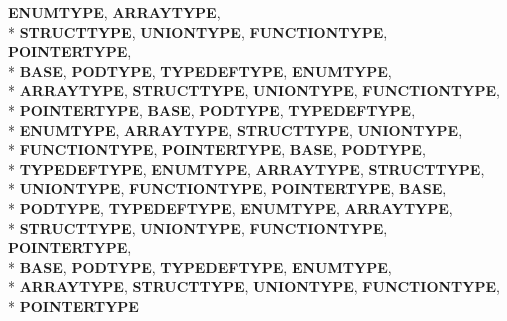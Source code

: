 \begin{DoxyCompactItemize}
{\bfseries E\-N\-U\-M\-T\-Y\-P\-E}, 
{\bfseries A\-R\-R\-A\-Y\-T\-Y\-P\-E}, 
\\*
{\bfseries S\-T\-R\-U\-C\-T\-T\-Y\-P\-E}, 
{\bfseries U\-N\-I\-O\-N\-T\-Y\-P\-E}, 
{\bfseries F\-U\-N\-C\-T\-I\-O\-N\-T\-Y\-P\-E}, 
{\bfseries P\-O\-I\-N\-T\-E\-R\-T\-Y\-P\-E}, 
\\*
{\bfseries B\-A\-S\-E}, 
{\bfseries P\-O\-D\-T\-Y\-P\-E}, 
{\bfseries T\-Y\-P\-E\-D\-E\-F\-T\-Y\-P\-E}, 
{\bfseries E\-N\-U\-M\-T\-Y\-P\-E}, 
\\*
{\bfseries A\-R\-R\-A\-Y\-T\-Y\-P\-E}, 
{\bfseries S\-T\-R\-U\-C\-T\-T\-Y\-P\-E}, 
{\bfseries U\-N\-I\-O\-N\-T\-Y\-P\-E}, 
{\bfseries F\-U\-N\-C\-T\-I\-O\-N\-T\-Y\-P\-E}, 
\\*
{\bfseries P\-O\-I\-N\-T\-E\-R\-T\-Y\-P\-E}, 
{\bfseries B\-A\-S\-E}, 
{\bfseries P\-O\-D\-T\-Y\-P\-E}, 
{\bfseries T\-Y\-P\-E\-D\-E\-F\-T\-Y\-P\-E}, 
\\*
{\bfseries E\-N\-U\-M\-T\-Y\-P\-E}, 
{\bfseries A\-R\-R\-A\-Y\-T\-Y\-P\-E}, 
{\bfseries S\-T\-R\-U\-C\-T\-T\-Y\-P\-E}, 
{\bfseries U\-N\-I\-O\-N\-T\-Y\-P\-E}, 
\\*
{\bfseries F\-U\-N\-C\-T\-I\-O\-N\-T\-Y\-P\-E}, 
{\bfseries P\-O\-I\-N\-T\-E\-R\-T\-Y\-P\-E}, 
{\bfseries B\-A\-S\-E}, 
{\bfseries P\-O\-D\-T\-Y\-P\-E}, 
\\*
{\bfseries T\-Y\-P\-E\-D\-E\-F\-T\-Y\-P\-E}, 
{\bfseries E\-N\-U\-M\-T\-Y\-P\-E}, 
{\bfseries A\-R\-R\-A\-Y\-T\-Y\-P\-E}, 
{\bfseries S\-T\-R\-U\-C\-T\-T\-Y\-P\-E}, 
\\*
{\bfseries U\-N\-I\-O\-N\-T\-Y\-P\-E}, 
{\bfseries F\-U\-N\-C\-T\-I\-O\-N\-T\-Y\-P\-E}, 
{\bfseries P\-O\-I\-N\-T\-E\-R\-T\-Y\-P\-E}, 
{\bfseries B\-A\-S\-E}, 
\\*
{\bfseries P\-O\-D\-T\-Y\-P\-E}, 
{\bfseries T\-Y\-P\-E\-D\-E\-F\-T\-Y\-P\-E}, 
{\bfseries E\-N\-U\-M\-T\-Y\-P\-E}, 
{\bfseries A\-R\-R\-A\-Y\-T\-Y\-P\-E}, 
\\*
{\bfseries S\-T\-R\-U\-C\-T\-T\-Y\-P\-E}, 
{\bfseries U\-N\-I\-O\-N\-T\-Y\-P\-E}, 
{\bfseries F\-U\-N\-C\-T\-I\-O\-N\-T\-Y\-P\-E}, 
{\bfseries P\-O\-I\-N\-T\-E\-R\-T\-Y\-P\-E}, 
\\*
{\bfseries B\-A\-S\-E}, 
{\bfseries P\-O\-D\-T\-Y\-P\-E}, 
{\bfseries T\-Y\-P\-E\-D\-E\-F\-T\-Y\-P\-E}, 
{\bfseries E\-N\-U\-M\-T\-Y\-P\-E}, 
\\*
{\bfseries A\-R\-R\-A\-Y\-T\-Y\-P\-E}, 
{\bfseries S\-T\-R\-U\-C\-T\-T\-Y\-P\-E}, 
{\bfseries U\-N\-I\-O\-N\-T\-Y\-P\-E}, 
{\bfseries F\-U\-N\-C\-T\-I\-O\-N\-T\-Y\-P\-E}, 
\\*
{\bfseries P\-O\-I\-N\-T\-E\-R\-T\-Y\-P\-E}

\end{DoxyCompactItemize}
